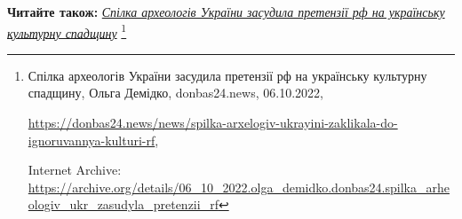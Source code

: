  
 
 
 
 


\textbf{Читайте також:} \href{https://archive.org/details/06_10_2022.olga_demidko.donbas24.spilka_arheologiv_ukr_zasudyla_pretenzii_rf}{\emph{Спілка археологів України засудила претензії рф на українську культурну спадщину}}%
\footnote{Спілка археологів України засудила претензії рф на українську культурну спадщину, Ольга Демідко, donbas24.news, 06.10.2022, \par%
\url{https://donbas24.news/news/spilka-arxelogiv-ukrayini-zaklikala-do-ignoruvannya-kulturi-rf}, \par%
Internet Archive: \url{https://archive.org/details/06_10_2022.olga_demidko.donbas24.spilka_arheologiv_ukr_zasudyla_pretenzii_rf}%
}
